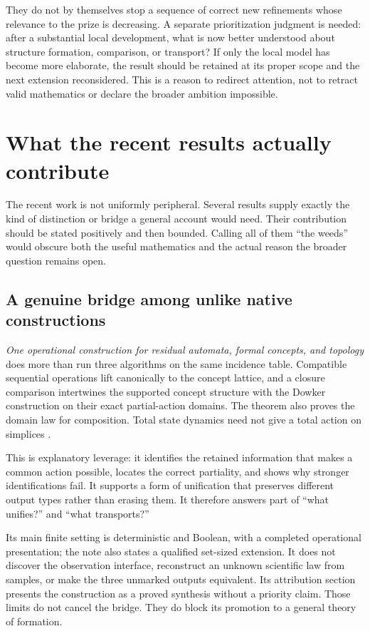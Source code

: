 \documentclass[11pt]{article}
\begin{document}
They do not by themselves stop a sequence of correct new refinements whose relevance to the prize is decreasing. A separate prioritization judgment is needed: after a substantial local development, what is now better understood about structure formation, comparison, or transport? If only the local model has become more elaborate, the result should be retained at its proper scope and the next extension reconsidered. This is a reason to redirect attention, not to retract valid mathematics or declare the broader ambition impossible.

\section{What the recent results actually contribute}
\label{sec:results}

The recent work is not uniformly peripheral. Several results supply exactly the kind of distinction or bridge a general account would need. Their contribution should be stated positively and then bounded. Calling all of them ``the weeds'' would obscure both the useful mathematics and the actual reason the broader question remains open.

\subsection{A genuine bridge among unlike native constructions}
\label{sec:common-result}

\emph{One operational construction for residual automata, formal concepts, and topology} does more than run three algorithms on the same incidence table. Compatible sequential operations lift canonically to the concept lattice, and a closure comparison intertwines the supported concept structure with the Dowker construction on their exact partial-action domains. The theorem also proves the domain law for composition. Total state dynamics need not give a total action on simplices \cite[the theorem One coherent partial action in the two native languages]{CommonGeneration}.

This is explanatory leverage: it identifies the retained information that makes a common action possible, locates the correct partiality, and shows why stronger identifications fail. It supports a form of unification that preserves different output types rather than erasing them. It therefore answers part of ``what unifies?'' and ``what transports?''

Its main finite setting is deterministic and Boolean, with a completed operational presentation; the note also states a qualified set-sized extension. It does not discover the observation interface, reconstruct an unknown scientific law from samples, or make the three unmarked outputs equivalent. Its attribution section presents the construction as a proved synthesis without a priority claim. Those limits do not cancel the bridge. They do block its promotion to a general theory of formation.
\end{document}
